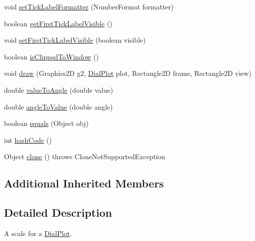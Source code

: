 \begin{DoxyCompactItemize}
\item 
void \mbox{\hyperlink{classorg_1_1jfree_1_1chart_1_1plot_1_1dial_1_1_standard_dial_scale_a0f777cb872c72e09fd3d769434c5dafc}{set\+Tick\+Label\+Formatter}} (Number\+Format formatter)
\item 
boolean \mbox{\hyperlink{classorg_1_1jfree_1_1chart_1_1plot_1_1dial_1_1_standard_dial_scale_a0d435c8d9de2e14b53e6999e3d8809dd}{get\+First\+Tick\+Label\+Visible}} ()
\item 
void \mbox{\hyperlink{classorg_1_1jfree_1_1chart_1_1plot_1_1dial_1_1_standard_dial_scale_a7dbb7bf5160437cccc534abe2ec96353}{set\+First\+Tick\+Label\+Visible}} (boolean visible)
\item 
boolean \mbox{\hyperlink{classorg_1_1jfree_1_1chart_1_1plot_1_1dial_1_1_standard_dial_scale_a3641b7ce81095160a7bd915ffee46b46}{is\+Clipped\+To\+Window}} ()
\item 
void \mbox{\hyperlink{classorg_1_1jfree_1_1chart_1_1plot_1_1dial_1_1_standard_dial_scale_a15369f20c895a86ffd0101f3bef1e6b0}{draw}} (Graphics2D g2, \mbox{\hyperlink{classorg_1_1jfree_1_1chart_1_1plot_1_1dial_1_1_dial_plot}{Dial\+Plot}} plot, Rectangle2D frame, Rectangle2D view)
\item 
double \mbox{\hyperlink{classorg_1_1jfree_1_1chart_1_1plot_1_1dial_1_1_standard_dial_scale_a6ae0ce846561db45890b0c345e4e8d0e}{value\+To\+Angle}} (double value)
\item 
double \mbox{\hyperlink{classorg_1_1jfree_1_1chart_1_1plot_1_1dial_1_1_standard_dial_scale_a0fadcd7cb0f8a32db1fa1cc3add12a35}{angle\+To\+Value}} (double angle)
\item 
boolean \mbox{\hyperlink{classorg_1_1jfree_1_1chart_1_1plot_1_1dial_1_1_standard_dial_scale_a6213237cec4008b076f20d61ecabcf6b}{equals}} (Object obj)
\item 
int \mbox{\hyperlink{classorg_1_1jfree_1_1chart_1_1plot_1_1dial_1_1_standard_dial_scale_a388a742872c946d4fa5ca8400c9cf008}{hash\+Code}} ()
\item 
Object \mbox{\hyperlink{classorg_1_1jfree_1_1chart_1_1plot_1_1dial_1_1_standard_dial_scale_aebbf0fae2794ae577f2a2fc7fa7eec6c}{clone}} ()  throws Clone\+Not\+Supported\+Exception 
\end{DoxyCompactItemize}
\subsection*{Additional Inherited Members}


\subsection{Detailed Description}
A scale for a \mbox{\hyperlink{classorg_1_1jfree_1_1chart_1_1plot_1_1dial_1_1_dial_plot}{Dial\+Plot}}.

